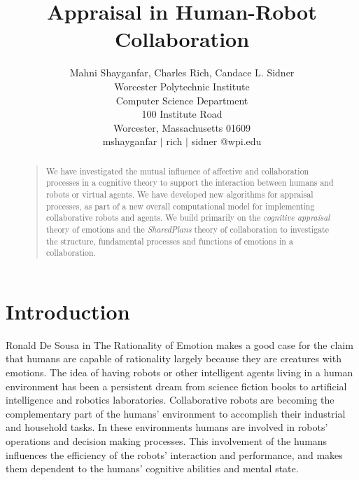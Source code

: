 \documentclass[letterpaper]{article}
\begin{document}
%
\title{Appraisal in Human-Robot Collaboration}
\author{Mahni Shayganfar, Charles Rich, Candace L. Sidner\\
Worcester Polytechnic Institute\\
Computer Science Department\\
100 Institute Road\\
Worcester, Massachusetts 01609\\
mshayganfar $|$ rich $|$ sidner @wpi.edu
}
\maketitle
\begin{abstract}
\vspace*{-2mm}
\begin{quote}
We have investigated the mutual influence of affective and collaboration
processes in a cognitive theory to support the interaction between humans and
robots or virtual agents. We have developed new algorithms for appraisal
processes, as part of a new overall computational model for implementing
collaborative robots and agents. We build primarily on the \textit{cognitive
appraisal} theory of emotions \cite{gratch:domain-independent} and the
\textit{SharedPlans} theory \cite{grosz:plans-discourse} of collaboration to
investigate the structure, fundamental processes and functions of emotions in a
collaboration.
\end{quote}
\end{abstract}

\vspace*{-6mm}
\section{Introduction}

Ronald De Sousa in The Rationality of Emotion \cite{sousa:rationality-emotion}
makes a good case for the claim that humans are capable of rationality largely
because they are creatures with emotions. The idea of having robots or other
intelligent agents living in a human environment has been a persistent dream
from science fiction books to artificial intelligence and robotics laboratories.
Collaborative robots are becoming the complementary part of the humans'
environment to accomplish their industrial and household tasks. In these
environments humans are involved in robots' operations and decision making
processes. This involvement of the humans influences the efficiency of the
robots' interaction and performance, and makes them dependent to the humans'
cognitive abilities and mental state.
\end{document}
